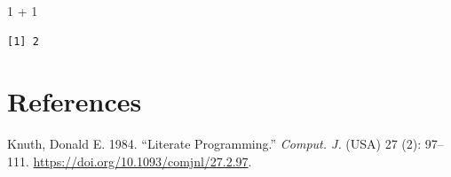 \documentclass[
  letterpaper,
  DIV=11,
  numbers=noendperiod]{scrreprt}
\newenvironment{Shaded}{\begin{snugshade}}{\end{snugshade}}
\newcommand{\DecValTok}[1]{\textcolor[rgb]{0.68,0.00,0.00}{#1}}
\newcommand{\SpecialCharTok}[1]{\textcolor[rgb]{0.37,0.37,0.37}{#1}}
\newlength{\cslhangindent}
\newenvironment{CSLReferences}[2] %
 {\begin{list}{}{%
  \setlength{\itemindent}{0pt}
  \setlength{\leftmargin}{0pt}
  \setlength{\parsep}{0pt}
  \ifodd #1
   \setlength{\leftmargin}{\cslhangindent}
   \setlength{\itemindent}{-1\cslhangindent}
  \fi
  \setlength{\itemsep}{#2\baselineskip}}}
 {\end{list}}
\begin{document}
\begin{Shaded}
\begin{Highlighting}[]
\DecValTok{1} \SpecialCharTok{+} \DecValTok{1}
\end{Highlighting}
\end{Shaded}

\begin{verbatim}
[1] 2
\end{verbatim}


\chapter*{References}\label{references}


\protect{}\label{refs}
\begin{CSLReferences}{1}{1}
Knuth, Donald E. 1984. {``Literate Programming.''} \emph{Comput. J.}
(USA) 27 (2): 97--111. \url{https://doi.org/10.1093/comjnl/27.2.97}.

\end{CSLReferences}
\end{document}
